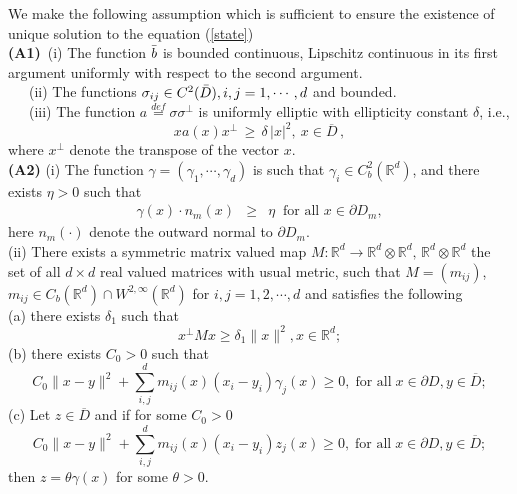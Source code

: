 \documentclass[11pt]{amsart}
\numberwithin{equation}{section}
\begin{document}
We make the following assumption which is sufficient to  ensure the existence of unique
 solution to the equation (\ref{state})\\
{\bf (A1)}\ (i) The function $\Bar{b}$ is bounded continuous, Lipschitz continuous in its first
argument uniformly with respect to the second argument. \\
\ \ \ (ii) The functions $\sigma_{ij} \in C^2 (\Bar{D}), i, j = 1, \cdots , d $  and bounded. \\
\ \ \ (iii) The function $a\stackrel{def}{=} \sigma\sigma^\bot$ is uniformly elliptic with ellipticity constant $\delta$, i.e.,
\[
x  a(x) x^{\bot} \, \geq \, \delta \, |x|^2, \ x \in \overline{D} \, ,
\]
where $x^{\bot}$ denote the transpose of the vector $x$.\\
{\bf (A2)} (i) The function $\gamma   = (\gamma_1, \cdots , \gamma_d) $  is such that 
$\gamma_i \in C^2_b(\mathbb{R}^d)$, and there exists $\eta>0$ such that 
\begin{eqnarray*}\label{no_slip}
\displaystyle { \gamma(x)\cdot n_m(x) } &\geq& \displaystyle { \eta \ \mbox{ for all } x\in  \partial D_m,}
 \end{eqnarray*}
here $ n_m(\cdot)$ denote the outward normal to $ \partial D_m$. \\
(ii) There exists a symmetric matrix valued map $ M: \mathbb{R}^d \longrightarrow \mathbb{R}^d
\otimes \mathbb{R}^d , \, \mathbb{R}^d \otimes \mathbb{R}^d$ the set of all $d \times d$
real valued matrices with usual metric, such that $M = (m_{ij})$, $m_{ij} \in C_b(\mathbb{R}^d)\cap W^{2,\infty}(\mathbb{R}^d)$ for $i,j=1,2,\cdots,d$ and satisfies the following\\
(a) there exists $\delta_1$ such that
$$ x^{\bot} M x \geq \delta_1 \|x\|^2, x\in \mathbb{R}^d ;$$
(b) there exists $C_0 >0$ such that
$$  C_0 \|x-y\|^2+\sum_{i,j}^d m_{ij}(x)(x_i-y_i)\gamma_j(x)\geq 0, \; \mbox{for  all}\; x\in \partial D, y\in \overline{D} ;$$
(c) Let $z \in \overline{D}$ and if for some $C_0>0$
$$  C_0 \|x-y\|^2+\sum_{i,j}^d m_{ij}(x)(x_i-y_i)z_j(x)\geq 0, \; \mbox{for  all}\; x\in \partial D, y\in \overline{D} ;$$
then $z=\theta \gamma(x)$ for some $\theta >0$.\\
\end{document}
